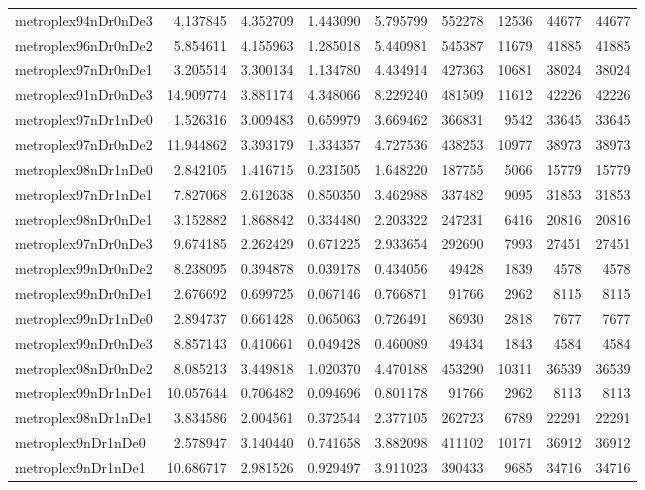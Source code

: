 \documentclass[../../../thesis.tex]{subfiles}
\begin{document}
\begin{longtable}{|l|r|r|r|r|r|r|r|r|}
metroplex94nDr0nDe3 & 4.137845 & 4.352709 & 1.443090 & 5.795799 & 552278 & 12536 & 44677 & 44677 \\
metroplex96nDr0nDe2 & 5.854611 & 4.155963 & 1.285018 & 5.440981 & 545387 & 11679 & 41885 & 41885 \\
metroplex97nDr0nDe1 & 3.205514 & 3.300134 & 1.134780 & 4.434914 & 427363 & 10681 & 38024 & 38024 \\
metroplex91nDr0nDe3 & 14.909774 & 3.881174 & 4.348066 & 8.229240 & 481509 & 11612 & 42226 & 42226 \\
metroplex97nDr1nDe0 & 1.526316 & 3.009483 & 0.659979 & 3.669462 & 366831 & 9542 & 33645 & 33645 \\
metroplex97nDr0nDe2 & 11.944862 & 3.393179 & 1.334357 & 4.727536 & 438253 & 10977 & 38973 & 38973 \\
metroplex98nDr1nDe0 & 2.842105 & 1.416715 & 0.231505 & 1.648220 & 187755 & 5066 & 15779 & 15779 \\
metroplex97nDr1nDe1 & 7.827068 & 2.612638 & 0.850350 & 3.462988 & 337482 & 9095 & 31853 & 31853 \\
metroplex98nDr0nDe1 & 3.152882 & 1.868842 & 0.334480 & 2.203322 & 247231 & 6416 & 20816 & 20816 \\
metroplex97nDr0nDe3 & 9.674185 & 2.262429 & 0.671225 & 2.933654 & 292690 & 7993 & 27451 & 27451 \\
metroplex99nDr0nDe2 & 8.238095 & 0.394878 & 0.039178 & 0.434056 & 49428 & 1839 & 4578 & 4578 \\
metroplex99nDr0nDe1 & 2.676692 & 0.699725 & 0.067146 & 0.766871 & 91766 & 2962 & 8115 & 8115 \\
metroplex99nDr1nDe0 & 2.894737 & 0.661428 & 0.065063 & 0.726491 & 86930 & 2818 & 7677 & 7677 \\
metroplex99nDr0nDe3 & 8.857143 & 0.410661 & 0.049428 & 0.460089 & 49434 & 1843 & 4584 & 4584 \\
metroplex98nDr0nDe2 & 8.085213 & 3.449818 & 1.020370 & 4.470188 & 453290 & 10311 & 36539 & 36539 \\
metroplex99nDr1nDe1 & 10.057644 & 0.706482 & 0.094696 & 0.801178 & 91766 & 2962 & 8113 & 8113 \\
metroplex98nDr1nDe1 & 3.834586 & 2.004561 & 0.372544 & 2.377105 & 262723 & 6789 & 22291 & 22291 \\
metroplex9nDr1nDe0 & 2.578947 & 3.140440 & 0.741658 & 3.882098 & 411102 & 10171 & 36912 & 36912 \\
metroplex9nDr1nDe1 & 10.686717 & 2.981526 & 0.929497 & 3.911023 & 390433 & 9685 & 34716 & 34716 \\

\end{longtable}
\end{document}
